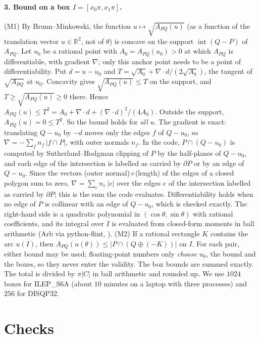 \documentclass[10pt,a4paper]{article}
\newcommand{\R}{\mathbb{R}}
\begin{document}
\paragraph{3. Bound on a box $I=[x_0\pi,x_1\pi]$.} (M1) By Brunn--Minkowski, the function $u\mapsto\sqrt{A_{PQ}(u)}$ (as a function of the translation
vector $u\in\R^2$, not of $\theta$) is concave on the support $\operatorname{int}(Q-P)$ of $A_{PQ}$.
Let $u_0$ be a rational point with $A_0=A_{PQ}(u_0)>0$ at which $A_{PQ}$ is differentiable, with
gradient $\nabla$; only this anchor point needs to be a point of differentiability. Put $d=u-u_0$
and $T=\sqrt{A_0}+\nabla\cdot d/(2\sqrt{A_0})$, the tangent of $\sqrt{A_{PQ}}$ at $u_0$. Concavity gives
$\sqrt{A_{PQ}(u)}\le T$ on the support, and $T\ge\sqrt{A_{PQ}(u)}\ge0$ there. Hence
$A_{PQ}(u)\le T^2=A_0+\nabla\cdot d+(\nabla\cdot d)^2/(4A_0)$. Outside the support, $A_{PQ}(u)=0\le T^2$.
So the bound holds for \emph{all} $u$. The gradient is exact: translating $Q-u_0$ by $-d$ moves only the edges $f$ of $Q-u_0$,
so $\nabla=-\sum_f n_f\,|f\cap P|$, with outer normals $n_f$. In the code, $P\cap(Q-u_0)$ is computed by
Sutherland--Hodgman clipping of $P$ by the half-planes of $Q-u_0$, and each edge of the intersection is
labelled as carried by $\partial P$ or by an edge of $Q-u_0$. Since the vectors (outer normal)$\times$(length)
of the edges of a closed polygon sum to zero, $\nabla=\sum_e n_e\,|e|$ over the edges $e$ of the
intersection labelled as carried by $\partial P$; this is the sum the code evaluates. Differentiability holds when no edge of $P$ is collinear with an edge of $Q-u_0$, which is
checked exactly. The right-hand side is a quadratic
polynomial in $(\cos\theta,\sin\theta)$ with rational coefficients, and its integral over $I$ is
evaluated from closed-form moments in ball arithmetic (Arb via python-flint, \cite{flint}). (M2) If
a rational rectangle $K$ contains the arc $u(I)$, then $A_{PQ}(u(\theta))\le|P\cap(Q\oplus(-K))|$ on
$I$. For each pair, either bound may be used; floating-point numbers only \emph{choose} $u_0$, the
bound and the boxes, so they never enter the validity. The box bounds are summed exactly. The total is
divided by $\pi|C|$ in ball arithmetic and rounded up. We use $1024$ boxes for ILEP\_S6A (about $10$ minutes
on a laptop with three processes) and $256$ for DISQP32.

\section{Checks}\label{sec:checks}
\end{document}
